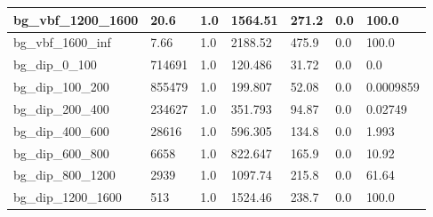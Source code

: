 \documentclass[a4paper, 10pt]{article}
\begin{document}
\begin{table}[H]
\begin{center}
\begin{tabular}{|m{23.0mm}|m{23.0mm}|m{18.0mm}|m{19.0mm}|m{19.0mm}|m{19.0mm}|m{19.0mm}|}
      \hline
      {\cellcolor{white}         bg\_vbf\_1200\_1600}& {\cellcolor{white}         20.6}& {\cellcolor{white}         1.0}& {\cellcolor{white}         1564.51}& {\cellcolor{white}         271.2}& {\cellcolor{red}         0.0}& {\cellcolor{red}         100.0}\\
      \hline
      {\cellcolor{white}         bg\_vbf\_1600\_inf}& {\cellcolor{white}         7.66}& {\cellcolor{white}         1.0}& {\cellcolor{white}         2188.52}& {\cellcolor{white}         475.9}& {\cellcolor{red}         0.0}& {\cellcolor{red}         100.0}\\
      \hline
      {\cellcolor{white}         bg\_dip\_0\_100}& {\cellcolor{white}         714691}& {\cellcolor{white}         1.0}& {\cellcolor{white}         120.486}& {\cellcolor{white}         31.72}& {\cellcolor{green}         0.0}& {\cellcolor{green}         0.0}\\
      \hline
      {\cellcolor{white}         bg\_dip\_100\_200}& {\cellcolor{white}         855479}& {\cellcolor{white}         1.0}& {\cellcolor{white}         199.807}& {\cellcolor{white}         52.08}& {\cellcolor{green}         0.0}& {\cellcolor{green}         0.0009859}\\
      \hline
      {\cellcolor{white}         bg\_dip\_200\_400}& {\cellcolor{white}         234627}& {\cellcolor{white}         1.0}& {\cellcolor{white}         351.793}& {\cellcolor{white}         94.87}& {\cellcolor{green}         0.0}& {\cellcolor{green}         0.02749}\\
      \hline
      {\cellcolor{white}         bg\_dip\_400\_600}& {\cellcolor{white}         28616}& {\cellcolor{white}         1.0}& {\cellcolor{white}         596.305}& {\cellcolor{white}         134.8}& {\cellcolor{green}         0.0}& {\cellcolor{green}         1.993}\\
      \hline
      {\cellcolor{white}         bg\_dip\_600\_800}& {\cellcolor{white}         6658}& {\cellcolor{white}         1.0}& {\cellcolor{white}         822.647}& {\cellcolor{white}         165.9}& {\cellcolor{orange}         0.0}& {\cellcolor{orange}         10.92}\\
      \hline
      {\cellcolor{white}         bg\_dip\_800\_1200}& {\cellcolor{white}         2939}& {\cellcolor{white}         1.0}& {\cellcolor{white}         1097.74}& {\cellcolor{white}         215.8}& {\cellcolor{red}         0.0}& {\cellcolor{red}         61.64}\\
      \hline
      {\cellcolor{white}         bg\_dip\_1200\_1600}& {\cellcolor{white}         513}& {\cellcolor{white}         1.0}& {\cellcolor{white}         1524.46}& {\cellcolor{white}         238.7}& {\cellcolor{red}         0.0}& {\cellcolor{red}         100.0}\\

\end{tabular}
\end{center}
\end{table}
\end{document}
